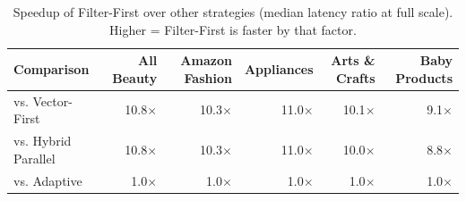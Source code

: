 \begin{table}[ht]
\centering
\small
\begin{tabular}{lrrrrr}
\hline
Comparison & All Beauty & Amazon Fashion & Appliances & Arts \& Crafts & Baby Products \\
\hline
vs. Vector-First & 10.8$\times$ & 10.3$\times$ & 11.0$\times$ & 10.1$\times$ & 9.1$\times$ \\
vs. Hybrid Parallel & 10.8$\times$ & 10.3$\times$ & 11.0$\times$ & 10.0$\times$ & 8.8$\times$ \\
vs. Adaptive & 1.0$\times$ & 1.0$\times$ & 1.0$\times$ & 1.0$\times$ & 1.0$\times$ \\
\hline
\end{tabular}
\caption{Speedup of Filter-First over other strategies (median latency ratio at full scale). Higher = Filter-First is faster by that factor.}
\label{tab:speedup}
\end{table}